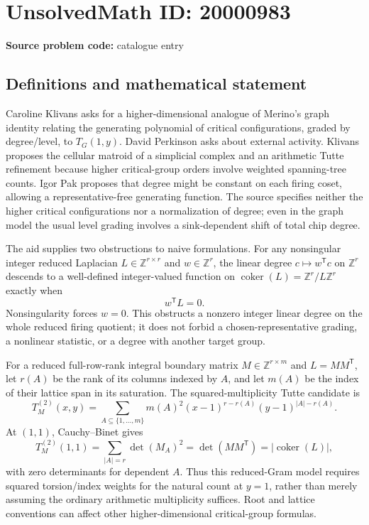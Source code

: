 \documentclass[11pt]{article}
\newcommand{\Z}{\mathbb{Z}}
\begin{document}
\section*{UnsolvedMath ID: 20000983}
\textbf{Source problem code:} catalogue entry
\subsection{Definitions and mathematical statement}
Caroline Klivans asks for a higher-dimensional analogue of Merino's graph identity relating the generating polynomial of critical configurations, graded by degree/level, to $T_G(1,y)$. David Perkinson asks about external activity. Klivans proposes the cellular matroid of a simplicial complex and an arithmetic Tutte refinement because higher critical-group orders involve weighted spanning-tree counts. Igor Pak proposes that degree might be constant on each firing coset, allowing a representative-free generating function. The source specifies neither the higher critical configurations nor a normalization of degree; even in the graph model the usual level grading involves a sink-dependent shift of total chip degree.

The aid supplies two obstructions to naive formulations. For any nonsingular integer reduced Laplacian $L\in\Z^{r\times r}$ and $w\in\Z^r$, the linear degree $c\mapsto w^{\mathsf T}c$ on $\Z^r$ descends to a well-defined integer-valued function on $\operatorname{coker}(L)=\Z^r/L\Z^r$ exactly when
\[
 w^{\mathsf T}L=0.
\]
Nonsingularity forces $w=0$. This obstructs a nonzero integer linear degree on the whole reduced firing quotient; it does not forbid a chosen-representative grading, a nonlinear statistic, or a degree with another target group.

For a reduced full-row-rank integral boundary matrix $M\in\Z^{r\times m}$ and $L=MM^{\mathsf T}$, let $r(A)$ be the rank of its columns indexed by $A$, and let $m(A)$ be the index of their lattice span in its saturation. The squared-multiplicity Tutte candidate is
\[
 T_M^{(2)}(x,y)=\sum_{A\subseteq\{1,\ldots,m\}}
 m(A)^2(x-1)^{r-r(A)}(y-1)^{|A|-r(A)}.
\]
At $(1,1)$, Cauchy--Binet gives
\[
 T_M^{(2)}(1,1)=\sum_{|A|=r}\det(M_A)^2=\det(MM^{\mathsf T})=|\operatorname{coker}(L)|,
\]
with zero determinants for dependent $A$. Thus this reduced-Gram model requires squared torsion/index weights for the natural count at $y=1$, rather than merely assuming the ordinary arithmetic multiplicity suffices. Root and lattice conventions can affect other higher-dimensional critical-group formulas.
\end{document}
